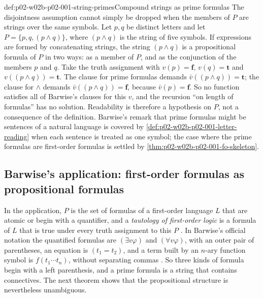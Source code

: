 \begin{hbwarning}{def:p02-w02b-p02-001-string-primes}{Compound strings as prime formulas}
The disjointness assumption cannot simply be dropped when the members of
\(P\) are strings over the same symbols.  Let \(p,q\) be distinct letters
and let \(P=\{p,q,(p\land q)\}\), where \((p\land q)\) is the string of
five symbols.  If expressions are formed by concatenating strings, the
string \((p\land q)\) is a propositional formula of \(P\) in two ways: as a
member of \(P\), and as the conjunction of the members \(p\) and \(q\).
Take the truth assignment with \(v(p)=\mathbf f\), \(v(q)=\mathbf t\) and
\(v((p\land q))=\mathbf t\).  The clause for prime formulas demands
\(\bar v((p\land q))=\mathbf t\); the clause for \(\land\) demands
\(\bar v((p\land q))=\mathbf f\), because \(\bar v(p)=\mathbf f\).  So no
function satisfies all of Barwise's clauses for this \(v\), and the
recursion ``on length of formulas'' has no solution.  Readability is
therefore a hypothesis on \(P\), not a consequence of the definition.
Barwise's remark that prime formulas might be sentences of a natural
language \cite[ch.~A.1, \S4, p.~23]{Barwise1977FirstOrder} is covered by
\cref{def:p02-w02b-p02-001-letter-reading} when each sentence is treated as
one symbol; the case where the prime formulas are first-order formulas is
settled by \cref{thm:p02-w02b-p02-001-fo-skeleton}.
\end{hbwarning}

\subsection{Barwise's application: first-order formulas as propositional formulas}
\label{sec:p02-w02b-p02-001-skeleton}

In the application, \(P\) is the set of formulas of a first-order language
\(L\) that are atomic or begin with a quantifier, and a \emph{tautology of
first-order logic} is a formula of \(L\) that is true under every truth
assignment to this \(P\) \cite[ch.~A.1, \S4, p.~28]{Barwise1977FirstOrder}.
In Barwise's official notation the quantified formulas are
\((\exists v\varphi)\) and \((\forall v\varphi)\), with an outer pair of
parentheses, an equation is \((t_1=t_2)\), and a term built by an \(n\)-ary
function symbol is \(f(t_1\cdots t_n)\), without separating commas
\cite[ch.~A.1, \S3, Definitions~3.2--3.4, pp.~18--19]{Barwise1977FirstOrder}.
So three kinds of formula begin with a left parenthesis, and a prime
formula is a string that contains connectives.  The next theorem shows
that the propositional structure is nevertheless unambiguous.

